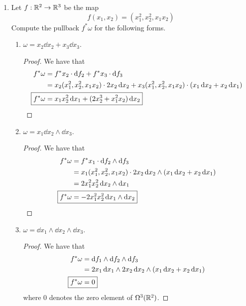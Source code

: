 \documentclass[../psets.tex]{subfiles}
\begin{document}
\begin{enumerate}[label={\textbf{2.6.\roman*.}}]
\begin{enumerate}
\begin{proof}
        \end{proof}
    \end{enumerate}
    \item Let $f:\R^2\to\R^3$ be the map
    \begin{equation*}
        f(x_1,x_2) = (x_1^2,x_2^2,x_1x_2)
    \end{equation*}
    Compute the pullback $f^*\omega$ for the following forms.
    \begin{enumerate}
        \item $\omega=x_2\dd{x_2}+x_3\dd{x_3}$.
        \begin{proof}
            We have that
            \begin{align*}
                f^*\omega &= f^*x_2\cdot\dd{f_2}+f^*x_3\cdot\dd{f_3}\\
                &= x_2(x_1^2,x_2^2,x_1x_2)\cdot 2x_2\dd{x_2}+x_3(x_1^2,x_2^2,x_1x_2)\cdot(x_1\dd{x_2}+x_2\dd{x_1})\\
                \Aboxed{f^*\omega &= x_1x_2^2\dd{x_1}+(2x_2^3+x_1^2x_2)\dd{x_2}}
            \end{align*}
        \end{proof}
        \item $\omega=x_1\dd{x_2}\wedge\dd{x_3}$.
        \begin{proof}
            We have that
            \begin{align*}
                f^*\omega &= f^*x_1\cdot\dd{f_2}\wedge\dd{f_3}\\
                &= x_1(x_1^2,x_2^2,x_1x_2)\cdot 2x_2\dd{x_2}\wedge(x_1\dd{x_2}+x_2\dd{x_1})\\
                &= 2x_1^2x_2^2\dd{x_2}\wedge\dd{x_1}\\
                \Aboxed{f^*\omega &= -2x_1^2x_2^2\dd{x_1}\wedge\dd{x_2}}
            \end{align*}
        \end{proof}
        \item $\omega=\dd{x_1}\wedge\dd{x_2}\wedge\dd{x_3}$.
        \begin{proof}
            We have that
            \begin{align*}
                f^*\omega &= \dd{f_1}\wedge\dd{f_2}\wedge\dd{f_3}\\
                &= 2x_1\dd{x_1}\wedge 2x_2\dd{x_2}\wedge(x_1\dd{x_2}+x_2\dd{x_1})\\
                \Aboxed{f^*\omega &= 0}
            \end{align*}
            where 0 denotes the zero element of $\ome[3]{\R^2}$.

\end{proof}
\end{enumerate}
\end{enumerate}
\end{document}

